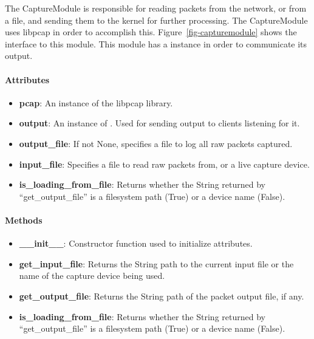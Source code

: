 \documentclass[titlepage]{article}
\begin{document}
The CaptureModule is responsible for reading packets from the network, or from
a file, and sending them to the kernel for further processing.  The
CaptureModule uses libpcap in order to accomplish this.
Figure~\ref{fig-capturemodule} shows the interface to this module.  This module
has a  instance in order to communicate its
output.

\paragraph{Attributes}
\begin{itemize}
    \item \textbf{pcap}: An instance of the libpcap library.
    \item \textbf{output}: An instance of .  Used
        for sending output to clients listening for it.
    \item \textbf{output\_file}: If not None, specifies a file to log all raw
        packets captured.
    \item \textbf{input\_file}: Specifies a file to read raw packets from, or a
        live capture device.
    \item \textbf{is\_loading\_from\_file}: Returns whether the String returned
        by ``get\_output\_file'' is a filesystem path (True) or a device name
        (False).
\end{itemize}

\paragraph{Methods}
\begin{itemize}
    \item \textbf{\_\_init\_\_}: Constructor function used to initialize
        attributes.
    \item \textbf{get\_input\_file}: Returns the String path to the current
        input file or the name of the capture device being used.
    \item \textbf{get\_output\_file}: Returns the String path of the packet
        output file, if any.
    \item \textbf{is\_loading\_from\_file}: Returns whether the String returned
        by ``get\_output\_file'' is a filesystem path (True) or a device name
        (False).
\end{itemize}

\end{document}
